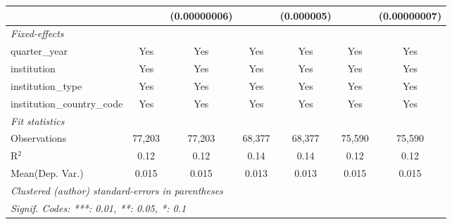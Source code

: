 \begin{tabular}{lcccccc}
                                      &               & (0.00000006)  &         & (0.000005) &               & (0.00000007)\\   
   \midrule
   \emph{Fixed-effects}\\
   quarter\_year                      & Yes           & Yes           & Yes     & Yes        & Yes           & Yes\\  
   institution                        & Yes           & Yes           & Yes     & Yes        & Yes           & Yes\\  
   institution\_type                  & Yes           & Yes           & Yes     & Yes        & Yes           & Yes\\  
   institution\_country\_code         & Yes           & Yes           & Yes     & Yes        & Yes           & Yes\\  
   \midrule
   \emph{Fit statistics}\\
   Observations                       & 77,203        & 77,203        & 68,377  & 68,377     & 75,590        & 75,590\\  
   R$^2$                              & 0.12          & 0.12          & 0.14    & 0.14       & 0.12          & 0.12\\  
Mean(Dep. Var.) & 0.015 & 0.015 & 0.013 & 0.013 & 0.015 & 0.015 \\
   \midrule \midrule
   \multicolumn{7}{l}{\emph{Clustered (author) standard-errors in parentheses}}\\
   \multicolumn{7}{l}{\emph{Signif. Codes: ***: 0.01, **: 0.05, *: 0.1}}\\
\end{tabular}
\par\endgroup
